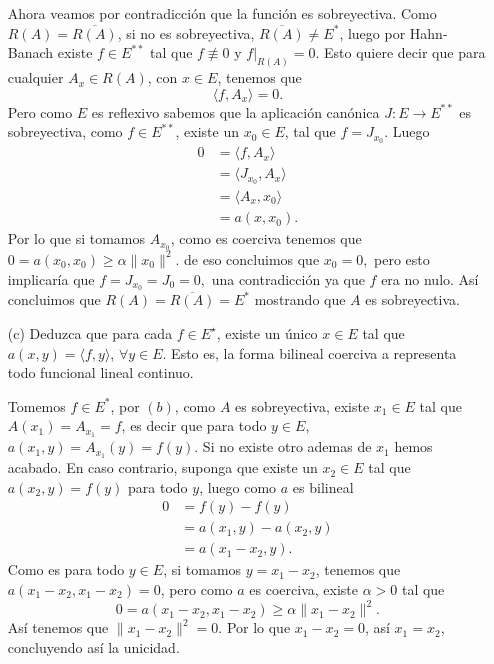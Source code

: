 \begin{itemize}
\begin{sproof}
       Ahora veamos por contradicción que la función es sobreyectiva. Como $R(A)=\overline{R(A)}$, si no es sobreyectiva, $\overline{R(A)}\neq E^*$, luego por Hahn-Banach existe $f\in E^{**}$ tal que $f\not\equiv 0$ y $f|_{R(A)}=0.$ Esto quiere decir que para cualquier $A_x\in R(A)$, con $x\in E$, tenemos que 
       $$\langle f,A_x\rangle=0.$$
       Pero como $E$ es reflexivo sabemos que la aplicación canónica $J:E\to E^{**}$ es sobreyectiva, como $f\in E^{**}$, existe un $x_0\in E$, tal que $f=J_{x_0}.$ Luego
       \begin{align*}
         0&=\langle f,A_x\rangle\\
         &=\langle J_{x_0},A_x\rangle\\
         &=\langle A_x,x_0\rangle\\
         &=a(x,x_0).
       \end{align*}
       Por lo que si tomamos $A_{x_0}$, como es coerciva tenemos que $0=a(x_0,x_0)\geq \alpha\|x_0\|^2.$ de eso concluimos que $x_0=0,$ pero esto implicaría que $f=J_{x_0}=J_0=0,$ una contradicción ya que $f$ era no nulo. Así concluimos que $R(A)=\overline{R(A)}=E^*$ mostrando que $A$ es sobreyectiva.

    \end{sproof}
    \item[(c)] Deduzca que para cada $f \in E^{\star}$, existe un único $x \in E$ tal que $a(x, y)=\langle f, y\rangle$, $\forall y \in E$. Esto es, la forma bilineal coerciva a representa todo funcional lineal continuo.
    \begin{sproof}
      Tomemos $f\in E^*$, por $(b)$, como $A$ es sobreyectiva, existe $x_1\in E$ tal que $A(x_1)=A_{x_1}=f$, es decir que para todo $y\in E$, $a(x_1,y)=A_{x_1}(y)=f(y).$ Si no existe otro ademas de $x_1$ hemos acabado. En caso contrario, suponga que existe un $x_2\in E$ tal que $a(x_2,y)=f(y)$ para todo $y$, luego como $a$ es bilineal
      \begin{align*}
        0&=f(y)-f(y)\\
        &=a(x_1,y)-a(x_2,y)\\
        &=a(x_1-x_2,y).
      \end{align*}
      Como es para todo $y\in E$, si tomamos $y=x_1-x_2$, tenemos que $a(x_1-x_2,x_1-x_2)=0$, pero como $a$ es coerciva, existe $\alpha>0$ tal que
      $$0=a(x_1-x_2,x_1-x_2)\geq\alpha\|x_1-x_2\|^2.$$
      Así tenemos que $\|x_1-x_2\|^2=0.$ Por lo que $x_1-x_2=0$, así $x_1=x_2$, concluyendo así la unicidad. 
    \end{sproof}
\end{itemize}
